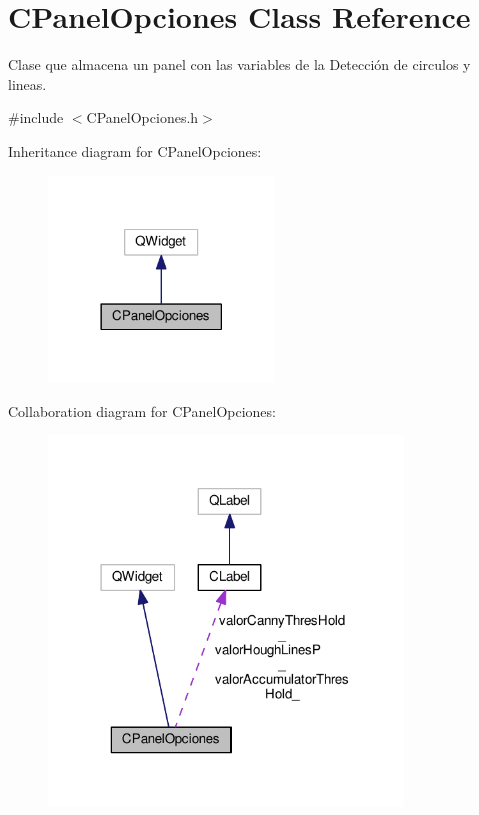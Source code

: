 \hypertarget{classCPanelOpciones}{}\section{C\+Panel\+Opciones Class Reference}
\label{classCPanelOpciones}


Clase que almacena un panel con las variables de la Detección de circulos y lineas.  




{\ttfamily \#include $<$C\+Panel\+Opciones.\+h$>$}



Inheritance diagram for C\+Panel\+Opciones\+:
\nopagebreak
\begin{figure}[H]
\begin{center}
\leavevmode
\includegraphics[width=170pt]{classCPanelOpciones__inherit__graph}
\end{center}
\end{figure}


Collaboration diagram for C\+Panel\+Opciones\+:
\nopagebreak
\begin{figure}[H]
\begin{center}
\leavevmode
\includegraphics[width=267pt]{classCPanelOpciones__coll__graph}
\end{center}
\end{figure}
